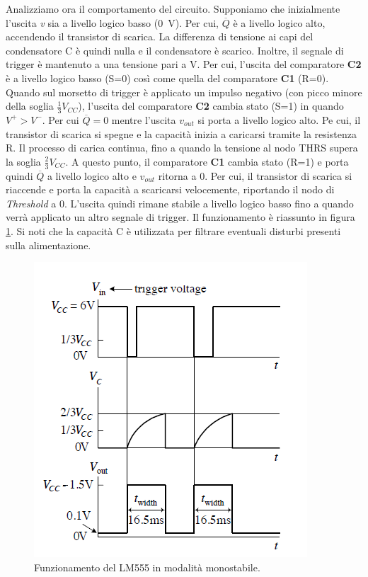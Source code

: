 \newpage
\noindent
Analizziamo ora il comportamento del circuito. Supponiamo che inizialmente l'uscita \textit{v} sia a livello logico basso (\SI{0}{\volt}). Per cui, $\overline{Q}$ è a livello logico alto, accendendo il transistor di scarica. La differenza di tensione ai capi del condensatore C è quindi nulla e il condensatore è scarico. Inoltre, il segnale di trigger è mantenuto a una tensione pari a V. Per cui, l'uscita del comparatore \textbf{C2} è a livello logico basso (S=0) così come quella del comparatore \textbf{C1} (R=0). Quando sul morsetto di trigger è applicato un impulso negativo (con picco minore della soglia $\frac{1}{3}V_{CC}$), l'uscita del comparatore \textbf{C2} cambia stato (S=1) in quando $V^+>V^-$. Per cui $\overline{Q}=0$ mentre l'uscita $v_{out}$ si porta a livello logico alto. Pe cui, il transistor di scarica si spegne e la capacità inizia a caricarsi tramite la resistenza R. Il processo di carica continua, fino a quando la tensione al nodo THRS supera la soglia $\frac{2}{3}V_{CC}$. A questo punto, il comparatore \textbf{C1} cambia stato (R=1) e porta quindi $\overline{Q}$ a livello logico alto e $v_{out}$ ritorna a 0. Per cui, il transistor di scarica si riaccende e porta la capacità a scaricarsi velocemente, riportando il nodo di \textit{Threshold} a 0. L'uscita quindi rimane stabile a livello logico basso fino a quando verrà applicato un altro segnale di trigger. Il funzionamento è riassunto in figura \ref{fig:555_mono}. Si noti che la capacità C è utilizzata per filtrare eventuali disturbi presenti sulla alimentazione.
\begin{figure}[h]
	\centering
	\includegraphics[width=0.5\linewidth]{./ImageFiles/Laboratorio 4/timer555}
	\caption{Funzionamento del LM555 in modalità monostabile.}
	\label{fig:555_mono}
\end{figure}

